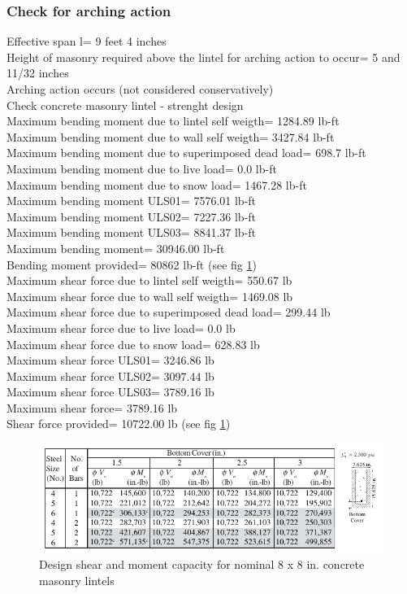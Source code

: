 \subsubsection{Check for arching action}
Effective span l=  9 feet 4 inches \\
Height of masonry required above the lintel for arching action to occur=  5 and 11/32 inches \\
Arching action occurs (not considered conservatively) \\
Check concrete masonry lintel - strenght design \\
Maximum bending moment due to lintel self weigth=  1284.89 lb-ft \\
Maximum bending moment due to wall self weigth=  3427.84 lb-ft \\
Maximum bending moment due to superimposed dead load=  698.7 lb-ft \\
Maximum bending moment due to live load=  0.0 lb-ft \\
Maximum bending moment due to snow load=  1467.28 lb-ft \\
Maximum bending moment ULS01=  7576.01 lb-ft \\
Maximum bending moment ULS02=  7227.36 lb-ft \\
Maximum bending moment ULS03=  8841.37 lb-ft \\
Maximum bending moment=  30946.00 lb-ft \\
Bending moment provided= 80862 lb-ft (see fig \ref{8x16}) \\
Maximum shear force due to lintel self weigth=  550.67 lb \\
Maximum shear force due to wall self weigth=  1469.08 lb \\
Maximum shear force due to superimposed dead load=  299.44 lb \\
Maximum shear force due to live load=  0.0 lb \\
Maximum shear force due to snow load=  628.83 lb \\
Maximum shear force ULS01=  3246.86 lb \\
Maximum shear force ULS02=  3097.44 lb \\
Maximum shear force ULS03=  3789.16 lb \\
Maximum shear force=  3789.16 lb \\
Shear force provided= 10722.00 lb (see fig \ref{8x16}) \\

\begin{figure}
  \begin{center}
  \includegraphics[width=120mm]{results_lintels/lintels_figures/blocks_8_16}
  \end{center}
  \caption{Design shear and moment capacity for nominal 8 x 8 in. concrete masonry lintels}\label{8x16}
\end{figure}

